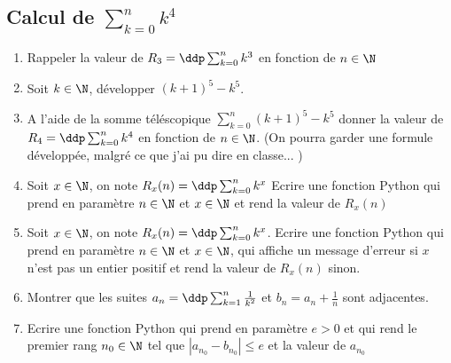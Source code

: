 \subsection{Calcul de $\sum_{k=0}^n k^4$ }

\begin{exercice}
\begin{enumerate}
\item Rappeler  la valeur  de $ R_3=\ddp \sum_{k=0}^n k^3$ en fonction de $n\in \N$
\item Soit $k\in \N$, développer $(k+1)^5 -k^5$. 
\item A l'aide de la  somme téléscopique  $\sum_{k=0}^n(k+1)^5 -k^5$ donner la valeur de 
$R_4= \ddp \sum_{k=0}^n k^4$  en fonction de $n\in \N$.  (On pourra garder une formule développée, malgré ce que j'ai pu dire en classe... ) 
\item Soit $x\in \N$, on note $R_x(n) =  \ddp \sum_{k=0}^n k^x$
Ecrire une fonction Python qui prend en paramètre $n\in \N $ et $x\in \N $  et rend la valeur de $R_x(n)$
\item Soit $x\in \N$, on note $R_x(n) =  \ddp \sum_{k=0}^n k^x$. 
Ecrire une fonction Python qui prend en paramètre $n\in \N $ et $x\in \N $, qui affiche un message d'erreur si $x$ n'est pas un entier positif et rend la valeur de $R_x(n)$ sinon. 

\item Montrer que les suites $ a_n=\ddp \sum_{k=1}^n \frac{1}{k^2}$  et $b_n= a_n + \frac{1}{n}$ sont adjacentes. 

\item  Ecrire une fonction   Python qui prend en paramètre $e>0$ et qui rend le premier rang $n_0\in \N$ tel que $\left|a_{n_0}-b_{n_0}\right| \leq e$
et la valeur de $a_{n_0}$
\end{enumerate}
\end{exercice}


